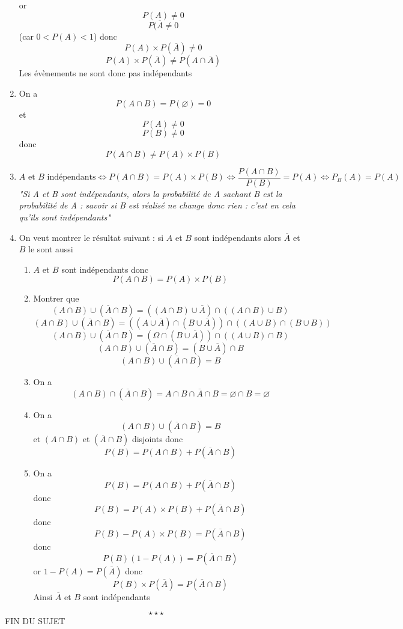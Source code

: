 \begin{enumerate}
or $$P(A) \neq 0$$
$$P(\overline{A} \neq 0$$
(car $0<P(A)<1$) donc
$$P(A) \times P(\overline{A})\neq 0$$
$$\boxed{P(A) \times P(\overline{A})\neq P(A\cap \overline{A})}$$
Les évènements ne sont donc pas indépendants
\item On a
$$P(A\cap B) = P(\varnothing) = 0$$
et 
$$P(A) \neq 0$$
$$P(B) \neq 0$$
donc 
$$\boxed{P(A\cap B) \neq P(A) \times P(B)}$$
\item 
$$A \text{ et } B \text{ indépendants} \Leftrightarrow P(A\cap B) = P(A)\times P(B) \Leftrightarrow \frac{P(A\cap B)}{P(B)} = P(A) \Leftrightarrow P_B(A) = P(A)$$
\emph{"Si A et B sont indépendants, alors la probabilité de A sachant B est la probabilité de A : savoir si B est réalisé ne change donc rien : c'est en cela qu'ils sont indépendants"}
\item On veut montrer le résultat suivant : si $A$ et $B$ sont indépendants alors $\overline{A}$ et $B$ le sont aussi
\begin{enumerate}
\item $A$ et $B$ sont indépendants donc 
$$\boxed{P(A\cap B) = P(A) \times P(B)}$$
\item Montrer que 
$$(A \cap B) \cup (\overline{A} \cap B) = ((A\cap B) \cup \overline{A}) \cap ((A\cap B) \cup B)$$
$$(A \cap B) \cup (\overline{A} \cap B) = ((A\cup \overline{A}) \cap (B \cup \overline{A})) \cap ((A\cup B) \cap (B\cup B))$$
$$(A \cap B) \cup (\overline{A} \cap B) = (\Omega \cap (B \cup \overline{A})) \cap ((A\cup B) \cap B)$$
$$(A \cap B) \cup (\overline{A} \cap B) = (B \cup \overline{A}) \cap B$$
$$(A \cap B) \cup (\overline{A} \cap B) = B$$
\item On a $$\boxed{(A \cap B) \cap (\overline{A} \cap B) = A \cap B \cap \overline{A} \cap B = \varnothing \cap B = \varnothing}$$
\item On a 
$$(A \cap B) \cup (\overline{A} \cap B) = B$$
et $(A \cap B)$ et $(\overline{A} \cap B)$ disjoints donc
$$\boxed{P(B) = P(A \cap B) + P(\overline{A} \cap B)}$$
\item On a
$$P(B) = P(A \cap B) + P(\overline{A} \cap B)$$
donc 
$$P(B) = P(A) \times P(B) + P(\overline{A} \cap B)$$
donc 
$$P(B) - P(A)\times P(B) = P(\overline{A} \cap B)$$
donc 
$$P(B)(1-P(A)) = P(\overline{A} \cap B)$$
or $1-P(A) = P(\overline{A})$ donc 
$$\boxed{P(B)\times P(\overline{A}) = P(\overline{A} \cap B)}$$
Ainsi $\overline{A}$ et $B$ sont indépendants
\end{enumerate}
\end{enumerate}
$$\star \star \star$$
\center
FIN DU SUJET
